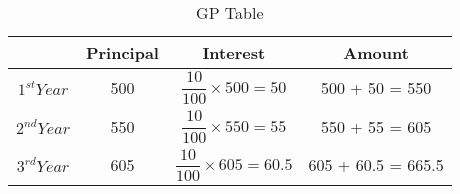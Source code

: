 \begin{table}[ht]
  \centering
  \begin{tabular}{|c|c|c|c|}
    \hline
     & \textbf{Principal} & \textbf{Interest} & \textbf{Amount} \\
    \hline
    $1^{st} Year$ & 500 &$  \dfrac{10}{100} \times 500 = 50 $ & 500 + 50 = 550 \\
    \hline
   $2^{nd} Year$ & 550 &$  \dfrac{10}{100} \times 550 = 55 $ & 550 + 55 = 605 \\
    \hline
    $3^{rd} Year$ & 605 &$  \dfrac{10}{100} \times 605 = 60.5 $ & 605 + 60.5 = 665.5 \\
    \hline
  \end{tabular}
  \vspace{2mm}
  \caption{GP Table}
  \label{tab:mytable}
\end{table}
